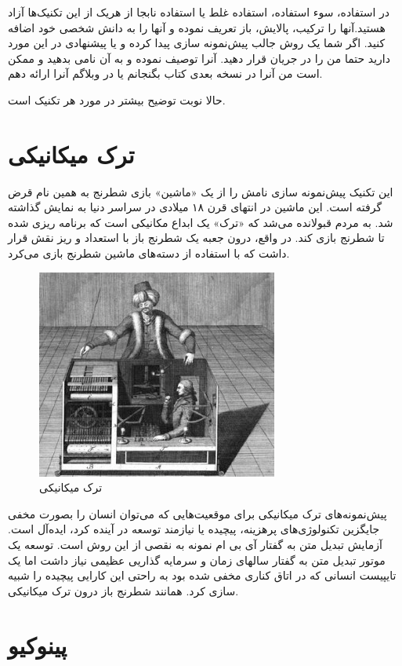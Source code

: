 در استفاده، سوء استفاده، استفاده غلط یا استفاده نابجا از هریک از این
تکنیک‌ها آزاد هستید.آنها را ترکیب، پالایش، باز تعریف نموده و آنها را به
دانش شخصی خود اضافه کنید. اگر شما یک روش جالب پیش‌نمونه سازی پیدا کرده و
یا پیشنهادی در این مورد دارید حتما من را در جریان قرار دهید. آنرا توصیف
نموده و به آن نامی بدهید و ممکن است من آنرا در نسخه بعدی کتاب بگنجانم یا
در وبلاگم آنرا ارائه دهم.

حالا نوبت توضیح بیشتر در مورد هر تکنیک است.

\section{ترک
میکانیکی}\label{ux62aux631ux6a9-ux645ux6ccux6a9ux627ux646ux6ccux6a9ux6cc}

این تکنیک پیش‌نمونه سازی نامش را از یک «ماشین» بازی شطرنج به همین نام
قرض گرفته است. این ماشین در انتهای قرن ۱۸ میلادی در سراسر دنیا به نمایش
گذاشته شد. به مردم قبولانده می‌شد که «ترک» یک ابداع مکانیکی است که
برنامه ریزی شده تا شطرنج بازی کند. در واقع، درون جعبه یک شطرنج باز با
استعداد و ریز نقش قرار داشت که با استفاده از دسته‌های ماشین شطرنج بازی
می‌کرد.

\begin{figure}[htbp]
\centering
\includegraphics{mechanicaltork.png}
\caption{ترک میکانیکی}
\end{figure}

پیش‌نمونه‌های ترک میکانیکی برای موقعیت‌هایی که می‌توان انسان را بصورت
مخفی جایگزین تکنولوژی‌های پرهزینه، پیچیده یا نیازمند توسعه در آینده کرد،
ایده‌آل است. آزمایش تبدیل متن به گفتار آی بی ام نمونه به نقصی از این روش
است. توسعه یک موتور تبدیل متن به گفتار سالهای زمان و سرمایه گذاریی عظیمی
نیاز داشت اما یک تایپیست انسانی که در اتاق کناری مخفی شده بود به راحتی
این کارایی پیچیده را شبیه سازی کرد. همانند شطرنج باز درون ترک میکانیکی.

\section{پینوکیو}\label{ux67eux6ccux646ux648ux6a9ux6ccux648}

